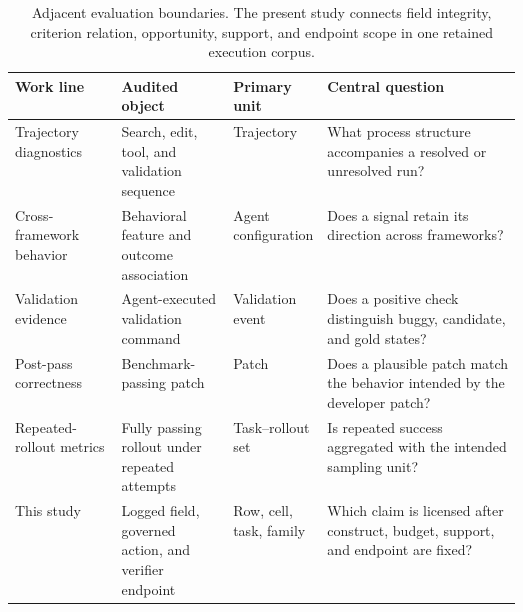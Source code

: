 \begin{table}[H]
\centering
\caption{Adjacent evaluation boundaries. The present study connects field integrity, criterion relation, opportunity, support, and endpoint scope in one retained execution corpus.}
\label{tab:positioning}
\small
\begin{tabularx}{\linewidth}{@{}L{0.21\linewidth}L{0.22\linewidth}L{0.16\linewidth}Y@{}}
\toprule
Work line & Audited object & Primary unit & Central question \\
\midrule
Trajectory diagnostics \citep{sahoo2026agentlens,shu2026traceprobe} & Search, edit, tool, and validation sequence & Trajectory & What process structure accompanies a resolved or unresolved run? \\
Cross-framework behavior \citep{ma2026samesignal} & Behavioral feature and outcome association & Agent configuration & Does a signal retain its direction across frameworks? \\
Validation evidence \citep{xu2026validation} & Agent-executed validation command & Validation event & Does a positive check distinguish buggy, candidate, and gold states? \\
Post-pass correctness \citep{wang2025patchdiff} & Benchmark-passing patch & Patch & Does a plausible patch match the behavior intended by the developer patch? \\
Repeated-rollout metrics \citep{jiang2026beyond} & Fully passing rollout under repeated attempts & Task--rollout set & Is repeated success aggregated with the intended sampling unit? \\
This study & Logged field, governed action, and verifier endpoint & Row, cell, task, family & Which claim is licensed after construct, budget, support, and endpoint are fixed? \\
\bottomrule
\end{tabularx}
\end{table}
